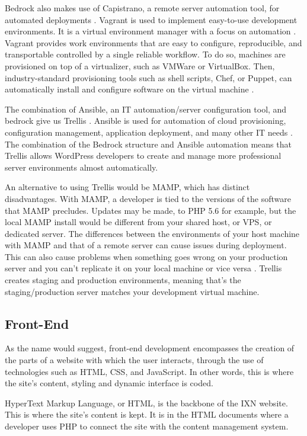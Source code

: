 \documentclass[fontsize=10pt]{extarticle}
\numberwithin{figure}{section} %
\begin{document}
Bedrock also makes use of Capistrano, a remote server automation tool,
for automated deployments \cite{p9}. Vagrant is used to implement
easy-to-use development environments. It is a virtual environment
manager with a focus on automation \cite{p10} . Vagrant provides work
environments that are easy to configure, reproducible, and transportable
controlled by a single reliable workflow. To do so, machines are
provisioned on top of a virtualizer, such as VMWare or VirtualBox. Then,
industry-standard provisioning tools such as shell scripts, Chef, or
Puppet, can automatically install and configure software on the virtual
machine \cite{p10} .

The combination of Ansible, an IT automation/server configuration tool,
and bedrock give us Trellis \cite{p11}. Ansible is used for automation
of cloud provisioning, configuration management, application deployment,
and many other IT needs \cite{p12}. The combination of the Bedrock
structure and Ansible automation means that Trellis allows WordPress
developers to create and manage more professional server environments
almost automatically.

An alternative to using Trellis would be MAMP, which has distinct
disadvantages. With MAMP, a developer is tied to the versions of the
software that MAMP precludes. Updates may be made, to PHP 5.6 for
example, but the local MAMP install would be different from your shared
host, or VPS, or dedicated server. The differences between the
environments of your host machine with MAMP and that of a remote server
can cause issues during deployment. This can also cause problems when
something goes wrong on your production server and you can't replicate
it on your local machine or vice versa \cite{p13} . Trellis creates
staging and production environments, meaning that's the
staging/production server matches your development virtual machine.

\hypertarget{front-end}{%
\subsection{Front-End}\label{front-end}}

As the name would suggest, front-end development encompasses the
creation of the parts of a website with which the user interacts,
through the use of technologies such as HTML, CSS, and JavaScript. In
other words, this is where the site's content, styling and dynamic
interface is coded.

HyperText Markup Language, or HTML, is the backbone of the IXN website.
This is where the site's content is kept. It is in the HTML documents
where a developer uses PHP to connect the site with the content
management system.
\end{document}

